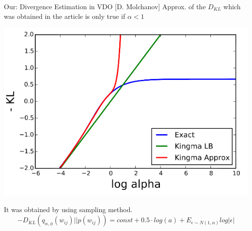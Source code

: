 \documentclass{beamer}
\begin{document}
\begin{frame}{Our: Divergence Estimation in VDO {\scriptsize[D. Molchanov]}}
	Approx. of the $D_{KL}$ which was obtained in the article is only true if  $\alpha < 1$
	\begin{center}
		\includegraphics[scale=0.4]{./img/kl.png}
	\end{center}
	It was obtained by using sampling method.
		$$- D_{KL}(q_{\alpha, \phi}(w_{ij}) || p(w_{ij})) = const + 0.5 \cdot log(a) + E_{\epsilon \sim N(1, \alpha)}log |\epsilon|$$
\end{frame}
\end{document}
